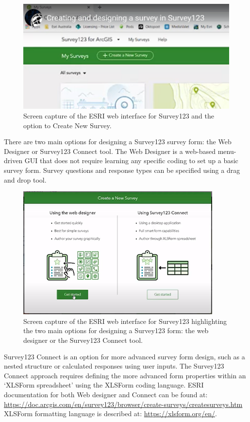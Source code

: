 \documentclass[
]{book}
\theoremstyle{definition}
\theoremstyle{definition}
\theoremstyle{definition}
\theoremstyle{definition}
\theoremstyle{remark}
\begin{document}
\begin{figure}
\includegraphics[width=0.9\linewidth]{figures/survey123/ESRIweb} \caption{Screen capture of the ESRI web interface for Survey123 and the option to Create New Survey.}\label{fig:ESRIweb}
\end{figure}

There are two main options for designing a Survey123 survey form: the Web Designer or Survey123 Connect tool. The Web Designer is a web-based menu-driven GUI that does not require learning any specific coding to set up a basic survey form. Survey questions and response types can be specified using a drag and drop tool.

\begin{figure}
\includegraphics[width=0.9\linewidth]{figures/survey123/ESRIweb2} \caption{Screen capture of the ESRI web interface for Survey123 highlighting the two main options for designing a Survey123 form: the web designer or the Survey123 Connect tool.}\label{fig:ESRIweb2}
\end{figure}

Survey123 Connect is an option for more advanced survey form design, such as a nested structure or calculated responses using user inputs. The Survey123 Connect approach requires defining the more advanced form properties within an `XLSForm spreadsheet' using the XLSForm coding language. ESRI documentation for both Web designer and Connect can be found at: \url{https://doc.arcgis.com/en/survey123/browser/create-surveys/createsurveys.htm}
XLSForm formatting language is described at: \url{https://xlsform.org/en/}.
\end{document}
